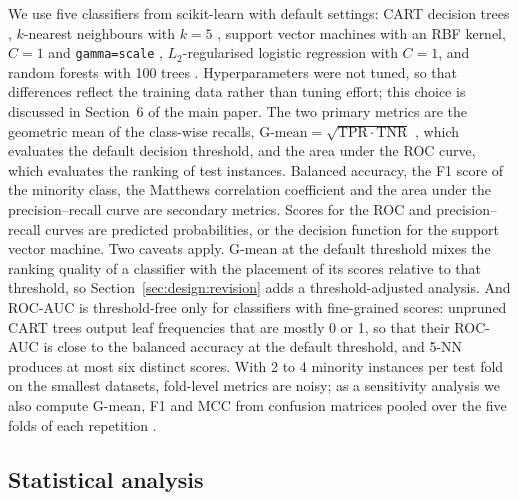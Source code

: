 We use five classifiers from scikit-learn \citep{pedregosa2011scikit} with default settings: CART decision trees \citep{breiman2017classification}, $k$-nearest neighbours with $k=5$ \citep{cover1967nearest}, support vector machines with an RBF kernel, $C=1$ and \texttt{gamma=scale} \citep{cortes1995support}, $L_2$-regularised logistic regression with $C=1$, and random forests with 100 trees \citep{breiman2001random}. Hyperparameters were not tuned, so that differences reflect the training data rather than tuning effort; this choice is discussed in Section~6 of the main paper. The two primary metrics are the geometric mean of the class-wise recalls, $\text{G-mean}=\sqrt{\mathrm{TPR}\cdot\mathrm{TNR}}$ \citep{kubat1997addressing,kubat1998machine}, which evaluates the default decision threshold, and the area under the ROC curve, which evaluates the ranking of test instances. Balanced accuracy, the F1 score of the minority class, the Matthews correlation coefficient \citep{chicco2020advantages} and the area under the precision--recall curve \citep{saito2015precision} are secondary metrics. Scores for the ROC and precision--recall curves are predicted probabilities, or the decision function for the support vector machine. Two caveats apply. G-mean at the default threshold mixes the ranking quality of a classifier with the placement of its scores relative to that threshold, so Section~\ref{sec:design:revision} adds a threshold-adjusted analysis. And ROC-AUC is threshold-free only for classifiers with fine-grained scores: unpruned CART trees output leaf frequencies that are mostly 0 or 1, so that their ROC-AUC is close to the balanced accuracy at the default threshold, and 5-NN produces at most six distinct scores. With 2 to 4 minority instances per test fold on the smallest datasets, fold-level metrics are noisy; as a sensitivity analysis we also compute G-mean, F1 and MCC from confusion matrices pooled over the five folds of each repetition \citep{forman2010apples}.

\subsection{Statistical analysis}\label{sec:design:stats}

